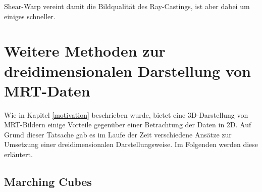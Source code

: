 Shear-Warp vereint damit die Bildqualität des Ray-Castings, ist aber dabei um einiges schneller.

\section{Weitere Methoden zur dreidimensionalen Darstellung von MRT-Daten}		 %
Wie in Kapitel \ref{motivation} beschrieben wurde, bietet eine 3D-Darstellung von MRT-Bildern einige Vorteile gegenüber einer Betrachtung der Daten in 2D. 
Auf Grund dieser Tatsache gab es im Laufe der Zeit verschiedene Ansätze zur Umsetzung einer dreidimensionalen Darstellungsweise. 
Im Folgenden werden diese erläutert. 



\subsection{Marching Cubes}

